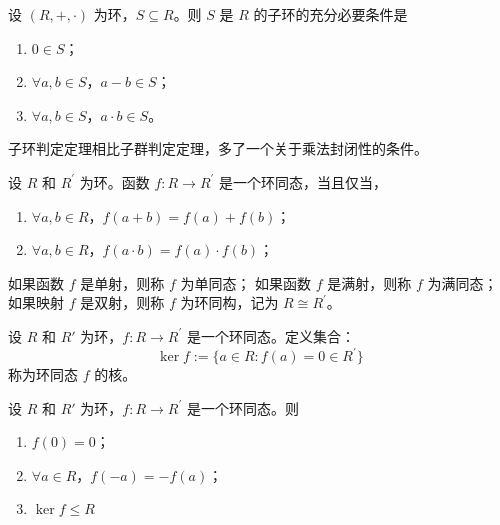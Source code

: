 \begin{theorem}[子环判定定理]
    设 $ (R,+,\cdot) $ 为环，$ S\subseteq R $。则 $ S $ 是 $ R $ 的子环的充分必要条件是
    \begin{enumerate}
        \item $ 0\in S $；
        \item $ \forall a,b\in S $，$ a-b\in S $；
        \item $ \forall a,b\in S $，$ a\cdot b \in S $。
    \end{enumerate}
    \label{thm:subring_test}
\end{theorem}

\begin{note}
    子环判定定理相比子群判定定理，多了一个关于乘法封闭性的条件。
\end{note}
\vspace{1em}

\begin{definition}
    设 $R$ 和 $R^{\prime}$ 为环。函数 $ f:R\to R^{\prime} $ 是一个环同态，当且仅当，
    \begin{enumerate}
        \item $\forall a,b\in R$，$f(a+b)=f(a)+f(b)$；
        \item $\forall a,b\in R$，$f(a\cdot b)=f(a)\cdot f(b)$；
    \end{enumerate}
    如果函数 $ f $ 是单射，则称 $ f $ 为单同态；
    如果函数 $ f $ 是满射，则称 $ f $ 为满同态；
    如果映射 $ f $ 是双射，则称 $ f $ 为环同构，记为 $ R\cong R^{\prime} $。
    \label{def:ring_homomorphism_and_isomorphism}
\end{definition}

\begin{definition}
    设 $R$ 和 $R'$ 为环，$ f:R\to R^{\prime} $ 是一个环同态。定义集合：
    \[
        \ker f := \{a\in R : f(a)=0\in R^{\prime}\}
    \]
    称为环同态 $ f $ 的核。
    \label{def:kernel_of_ring_homomorphism}
\end{definition}

\begin{proposition}[环同态的性质]
    设 $R$ 和 $R'$ 为环，$ f:R\to R^{\prime} $ 是一个环同态。则
    \begin{enumerate}
        \item $ f(0)=0 $；
        \item $\forall a\in R$，$ f(-a)=-f(a) $；
        \item $\ker f \leq R$
    \end{enumerate}
\end{proposition}

